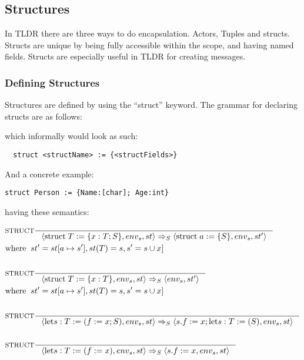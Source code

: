 \subsection{Structures}
\label{subsec:structs}

In TLDR there are three ways to do encapsulation. Actors, Tuples and structs. Structs are unique by being fully accessible within the scope, and having named fields. Structs are especially useful in TLDR for creating messages.

\subsubsection{Defining Structures}
\label{sec:defStructures}

Structures are defined by using the \enquote{struct} keyword. The grammar for declaring structs are as follows:


which informally would look as such:

\begin{verbatim}
  struct <structName> := {<structFields>}
\end{verbatim}

And a concrete example:

\begin{lstlisting}[style=TLDR]
  struct Person := {Name:[char]; Age:int}
\end{lstlisting}

having these semantics:

\begin{align*}
&\inference[$\text{STRUCT}$]{}
                            {\Braket{\Tstruct T := \{x:T;S\}, env_s, st} \Rightarrow_S \Braket{\Tstruct a := \{S\},env_s,st'}}
\\
&{\Twhere st' = st[a \mapsto s'],st(T) = s,s' = s \cup x]}
\\\\
&\inference[$\text{STRUCT}$]{}
                            {\Braket{\Tstruct T := \{x:T\}, env_s, st} \Rightarrow_S \Braket{env_s,st'}}
\\
&{\Twhere st' = st[a \mapsto s'],st(T) = s,s' = s \cup x]}
\\\\
&\inference[$\text{STRUCT}$]{}
                            {\Braket{\Tlet s:T := (f := x;S),env_s,st} \Rightarrow_S \Braket{s.f := x;\Tlet s:T := (S),env_s,st}}
\\\\
&\inference[$\text{STRUCT}$]{}
                            {\Braket{\Tlet s:T := (f := x),env_s,st} \Rightarrow_S \Braket{s.f := x,env_s,st}}
\end{align*}

